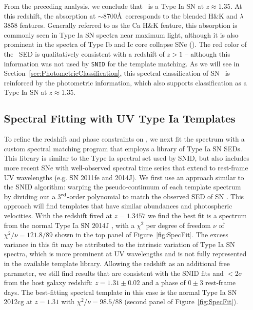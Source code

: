 From the preceding analysis, we conclude that \tomas\ is a Type Ia SN
at $z\approx1.35$.  At this redshift, the absorption at $\sim$8700\AA\
corresponds to the blended  H\&K and  $\lambda$3858 features.  Generally referred to as the Ca H\&K feature, this absorption is commonly seen in Type Ia SN spectra
near maximum light, although it is also prominent in the spectra of
Type Ib and Ic core collapse SNe (\CCSNe).  The red color of
the \tomas\ SED is qualitatively consistent with a redshift of $z>1$
-- although this information was not used by {\tt SNID} for the
template matching.  As we will see in
Section~\ref{sec:PhotometricClassification}, this spectral
classification of SN \tomas\ is reinforced by the photometric
information, which also supports classification as a Type Ia SN at
$z\approx1.35$.


\subsection{Spectral Fitting with UV Type Ia Templates}
\label{sec:SpecRedshift}

To refine the redshift and phase constraints on \tomas, we next fit
the spectrum with a custom spectral matching program that employs a
library of Type Ia SN SEDs.  This library is similar to the Type Ia
spectral set used by SNID, but also includes more recent SNe with
well-observed spectral time series that extend to rest-frame UV
wavelengths (e.g. SN 2011fe and 2014J).  We first use an approach
similar to the SNID algorithm: warping the pseudo-continuum of each
template spectrum by dividing out a 3$^{\rm rd}$-order polynomial to
match the observed SED of SN \tomas.  This approach will find
templates that have similar abundances and photospheric
velocities. With the redshift fixed at $z=1.3457$ we find the best fit
is a spectrum from the normal Type Ia SN 2014J \citep{Foley:2014},
with a $\chi^2$ per degree of freedom $\nu$ of $\chi^2/\nu=121.8/89$
shown in the top panel of Figure~\ref{fig:SpecFit}. The excess
variance in this fit may be attributed to the intrinsic variation of
Type Ia SN spectra, which is more prominent at UV
wavelengths \citep[e.g.][]{Foley:2008b,Wang:2012} and is not fully
represented in the available template library.  Allowing the redshift
as an additional free parameter, we still find results that are
consistent with the SNID fits and $<2\sigma$ from the host galaxy
redshift: $z=1.31\pm0.02$ and a phase of $0\pm3$ rest-frame days. The
best-fitting spectral template in this case is the normal Type Ia SN
2012cg \citep{Amanullah:2015} at $z=1.31$ with $\chi^2/\nu=98.5/88$
(second panel of Figure~\ref{fig:SpecFit}).


